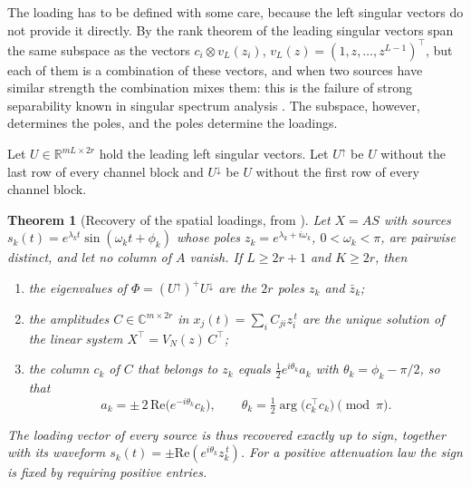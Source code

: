 \documentclass{article}
\newtheorem{theorem}{\bf Theorem}
\begin{document}
The loading has to be defined with some care, because the left singular vectors do not provide it directly. By the rank theorem of \cite{ref-companionA} the leading singular vectors span the same subspace as the vectors $c_i \otimes v_L(z_i)$, $v_L(z) = (1, z, \dots, z^{L-1})^{\top}$, but each of them is a combination of these vectors, and when two sources have similar strength the combination mixes them: this is the failure of strong separability known in singular spectrum analysis \cite{ref-Golyandina04}. The subspace, however, determines the poles, and the poles determine the loadings.

Let $U \in \mathbb{R}^{mL \times 2r}$ hold the leading left singular vectors. Let $U^{\uparrow}$ be $U$ without the last row of every channel block and $U^{\downarrow}$ be $U$ without the first row of every channel block.

\begin{theorem}[Recovery of the spatial loadings, from \cite{ref-companionA}] \label{thm:loadings}
Let $X = AS$ with sources $s_k(t) = e^{\lambda_k t} \sin(\omega_k t + \phi_k)$ whose poles $z_k = e^{\lambda_k + i\omega_k}$, $0 < \omega_k < \pi$, are pairwise distinct, and let no column of $A$ vanish. If $L \ge 2r + 1$ and $K \ge 2r$, then

\begin{enumerate}
\renewcommand{\labelenumi}{(\roman{enumi})}
\item
  the eigenvalues of $\Phi = (U^{\uparrow})^{+} U^{\downarrow}$ are the $2r$ poles $z_k$ and $\bar{z}_k$;
\item
  the amplitudes $C \in \mathbb{C}^{m \times 2r}$ in $x_j(t) = \sum_i C_{ji} z_i^{\,t}$ are the unique solution of the linear system $X^{\top} = V_N(z)\, C^{\top}$;
\item
  the column $c_k$ of $C$ that belongs to $z_k$ equals $\tfrac{1}{2} e^{i\theta_k} a_k$ with $\theta_k = \phi_k - \pi/2$, so that 
\begin{equation} \label{eq:loading}
a_k = \pm\, 2\, \mathrm{Re}\bigl(e^{-i\theta_k} c_k\bigr), \qquad \theta_k = \tfrac{1}{2} \arg\bigl(c_k^{\top} c_k\bigr) \pmod{\pi}.
\end{equation}
\end{enumerate}

The loading vector of every source is thus recovered exactly up to sign, together with its waveform $s_k(t) = \pm\mathrm{Re}(e^{i\theta_k} z_k^{\,t})$. For a positive attenuation law the sign is fixed by requiring positive entries.
\end{theorem}
\end{document}
